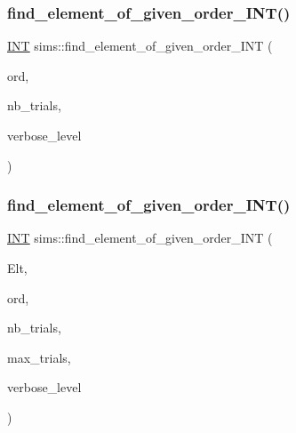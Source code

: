 \subsubsection{\texorpdfstring{find\+\_\+element\+\_\+of\+\_\+given\+\_\+order\+\_\+\+I\+N\+T()}{find\_element\_of\_given\_order\_INT()}\hspace{0.1cm}{\footnotesize\ttfamily [1/2]}}
{\footnotesize\ttfamily \mbox{\hyperlink{galois_8h_a09fddde158a3a20bd2dcadb609de11dc}{I\+NT}} sims\+::find\+\_\+element\+\_\+of\+\_\+given\+\_\+order\+\_\+\+I\+NT (\begin{DoxyParamCaption}\item[{\mbox{\hyperlink{galois_8h_a09fddde158a3a20bd2dcadb609de11dc}{I\+NT}}}]{ord,  }\item[{\mbox{\hyperlink{galois_8h_a09fddde158a3a20bd2dcadb609de11dc}{I\+NT}} \&}]{nb\+\_\+trials,  }\item[{\mbox{\hyperlink{galois_8h_a09fddde158a3a20bd2dcadb609de11dc}{I\+NT}}}]{verbose\+\_\+level }\end{DoxyParamCaption})}

\mbox{\label{classsims_afea49ca2608d83a8e0fa9989e0730199}} 
\subsubsection{\texorpdfstring{find\+\_\+element\+\_\+of\+\_\+given\+\_\+order\+\_\+\+I\+N\+T()}{find\_element\_of\_given\_order\_INT()}\hspace{0.1cm}{\footnotesize\ttfamily [2/2]}}
{\footnotesize\ttfamily \mbox{\hyperlink{galois_8h_a09fddde158a3a20bd2dcadb609de11dc}{I\+NT}} sims\+::find\+\_\+element\+\_\+of\+\_\+given\+\_\+order\+\_\+\+I\+NT (\begin{DoxyParamCaption}\item[{\mbox{\hyperlink{galois_8h_a09fddde158a3a20bd2dcadb609de11dc}{I\+NT}} $\ast$}]{Elt,  }\item[{\mbox{\hyperlink{galois_8h_a09fddde158a3a20bd2dcadb609de11dc}{I\+NT}}}]{ord,  }\item[{\mbox{\hyperlink{galois_8h_a09fddde158a3a20bd2dcadb609de11dc}{I\+NT}} \&}]{nb\+\_\+trials,  }\item[{\mbox{\hyperlink{galois_8h_a09fddde158a3a20bd2dcadb609de11dc}{I\+NT}}}]{max\+\_\+trials,  }\item[{\mbox{\hyperlink{galois_8h_a09fddde158a3a20bd2dcadb609de11dc}{I\+NT}}}]{verbose\+\_\+level }\end{DoxyParamCaption})}

